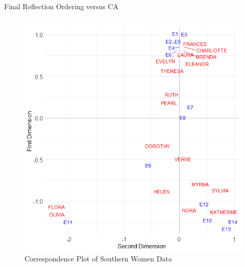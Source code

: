 \documentclass[
  ignorenonframetext,
]{beamer}
\begin{document}
\begin{frame}{Final Reflection Ordering versus CA}
\begin{columns}[T]
\begin{column}{0.5\textwidth}
\begin{figure}
{\centering \includegraphics{Plots/ca-sw.png}

}

\caption{Correspondence Plot of Southern Women Data}

\end{figure}
\end{column}
\end{columns}
\end{frame}
\end{document}
